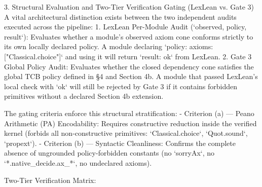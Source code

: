 3. Structural Evaluation and Two-Tier Verification Gating (LexLean vs. Gate 3)
A vital architectural distinction exists between the two independent audits executed across the pipeline:
1. LexLean Per-Module Audit (`{observed, policy, result}`): Evaluates whether a module's observed axiom cone conforms strictly to its own locally declared policy. A module declaring `policy: {axioms: ["Classical.choice"]}` and using it will return `result: ok` from LexLean.
2. Gate 3 Global Policy Audit: Evaluates whether the closed dependency cone satisfies the global TCB policy defined in §4 and Section 4b. A module that passed LexLean's local check with `ok` will still be rejected by Gate 3 if it contains forbidden primitives without a declared Section 4b extension.

The gating criteria enforce this structural stratification:
- Criterion (a) — Peano Arithmetic (PA) Encodability: Requires constructive reduction inside the verified kernel (forbids all non-constructive primitives: `Classical.choice`, `Quot.sound`, `propext`).
- Criterion (b) — Syntactic Cleanliness: Confirms the complete absence of ungrounded policy-forbidden constants (no `sorryAx`, no `*.native_decide.ax_*`, no undeclared axioms).

Two-Tier Verification Matrix:

